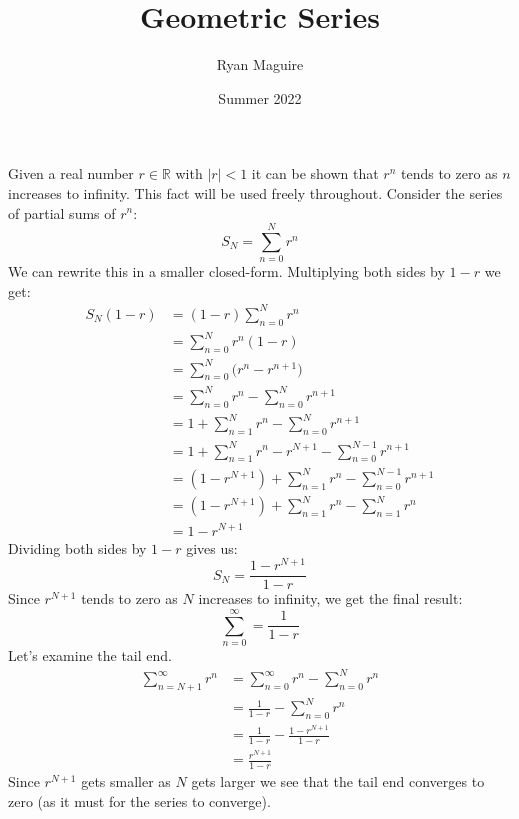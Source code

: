 \documentclass{article}
\title{Geometric Series}
\author{Ryan Maguire}
\date{Summer 2022}
\theoremstyle{plain}
\theoremstyle{normal}
\begin{document}
    \maketitle
    Given a real number $r\in\mathbb{R}$ with $|r|<1$ it can be shown that
    $r^{n}$ tends to zero as $n$ increases to infinity. This fact will be used
    freely throughout. Consider the series of partial sums of $r^{n}$:
    \begin{equation}
        S_{N}=\sum_{n=0}^{N}r^{n}
    \end{equation}
    We can rewrite this in a smaller closed-form. Multiplying both sides
    by $1-r$ we get:
    \begin{align}
        S_{N}(1-r)
        &=(1-r)\sum_{n=0}^{N}r^{n}\\
        &=\sum_{n=0}^{N}r^{n}(1-r)\\
        &=\sum_{n=0}^{N}\big(r^{n}-r^{n+1}\big)\\
        &=\sum_{n=0}^{N}r^{n}-\sum_{n=0}^{N}r^{n+1}\\
        &=1+\sum_{n=1}^{N}r^{n}-\sum_{n=0}^{N}r^{n+1}\\
        &=1+\sum_{n=1}^{N}r^{n}-r^{N+1}-\sum_{n=0}^{N-1}r^{n+1}\\
        &=(1-r^{N+1})+\sum_{n=1}^{N}r^{n}-\sum_{n=0}^{N-1}r^{n+1}\\
        &=(1-r^{N+1})+\sum_{n=1}^{N}r^{n}-\sum_{n=1}^{N}r^{n}\\
        &=1-r^{N+1}
    \end{align}
    Dividing both sides by $1-r$ gives us:
    \begin{equation}
        S_{N}=\frac{1-r^{N+1}}{1-r}
    \end{equation}
    Since $r^{N+1}$ tends to zero as $N$ increases to infinity, we get the
    final result:
    \begin{equation}
        \sum_{n=0}^{\infty}=\frac{1}{1-r}
    \end{equation}
    Let's examine the tail end.
    \begin{align}
        \sum_{n=N+1}^{\infty}r^{n}
        &=\sum_{n=0}^{\infty}r^{n}-\sum_{n=0}^{N}r^{n}\\
        &=\frac{1}{1-r}-\sum_{n=0}^{N}r^{n}\\
        &=\frac{1}{1-r}-\frac{1-r^{N+1}}{1-r}\\
        &=\frac{r^{N+1}}{1-r}
    \end{align}
    Since $r^{N+1}$ gets smaller as $N$ gets larger we see that the tail
    end converges to zero (as it must for the series to converge).
\end{document}
